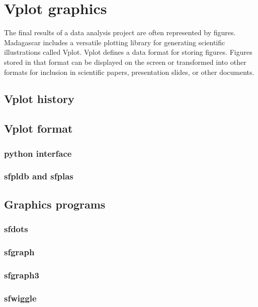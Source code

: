 \chapter{Vplot graphics}

The final results of a data analysis project are often represented by figures. Madagascar includes a versatile plotting library for generating scientific illustrations called Vplot. Vplot defines a data format for storing figures. Figures stored in that format can be displayed on the screen or transformed into other formats for inclusion in scientific papers, presentation slides, or other documents.

\section{Vplot history}

\section{Vplot format}

\subsection{python interface}

\subsection{sfpldb and sfplas}

\section{Graphics programs}

\subsection{sfdots}

\subsection{sfgraph}

\subsection{sfgraph3}

\subsection{sfwiggle}

